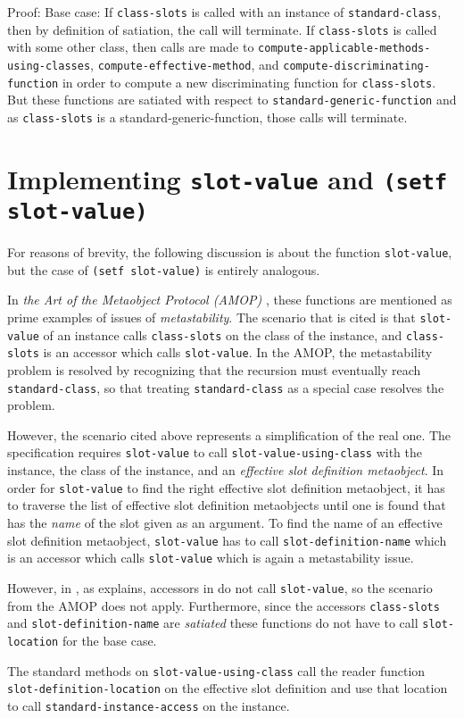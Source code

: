 Proof: Base case: If \texttt{class-slots} is called with an instance
of \texttt{standard-class}, then by definition of satiation, the call
will terminate.  If \texttt{class-slots} is called with some other
class, then calls are made to
\texttt{compute-applicable-methods-using-classes},
\texttt{compute-effective-method}, and
\texttt{compute-discriminating-function} in order to compute a new
discriminating function for \texttt{class-slots}.  But these functions
are satiated with respect to \texttt{standard-generic-function} and as
\texttt{class-slots} is a standard-generic-function, those calls
will terminate. 

\section{Implementing \texttt{slot-value} and \texttt{(setf slot-value)}}

For reasons of brevity, the following discussion is about the function
\texttt{slot-value}, but the case of \texttt{(setf slot-value)} is
entirely analogous. 

In \emph{the Art of the Metaobject Protocol (AMOP)}
\cite{Kiczales:1991:AMP:574212}, these functions are mentioned as
prime examples of issues of \emph{metastability}.  The scenario that
is cited is that \texttt{slot-value} of an instance calls
\texttt{class-slots} on the class of the instance, and
\texttt{class-slots} is an accessor which calls \texttt{slot-value}.
In the AMOP, the metastability problem is resolved by recognizing that
the recursion must eventually reach \texttt{standard-class}, so that
treating \texttt{standard-class} as a special case resolves the
problem.

However, the scenario cited above represents a simplification of the
real one.  The specification requires \texttt{slot-value} to call
\texttt{slot-value-using-class} with the instance, the class of the
instance, and an \emph{effective slot definition metaobject}.  In
order for \texttt{slot-value} to find the right effective slot
definition metaobject, it has to traverse the list of effective slot
definition metaobjects until one is found that has the \emph{name} of
the slot given as an argument.  To find the name of an effective slot
definition metaobject, \texttt{slot-value} has to call
\texttt{slot-definition-name} which is an accessor which calls
\texttt{slot-value} which is again a metastability issue.

However, in \sysname{}, as
 explains,
accessors in \sysname{} do not call \texttt{slot-value}, so the
scenario from the AMOP does not apply.  Furthermore, since the
accessors \texttt{class-slots} and \texttt{slot-definition-name} are
\emph{satiated}
 these
functions do not have to call \texttt{slot-location} for the base
case. 

The standard methods on \texttt{slot-value-using-class} call the
reader function \texttt{slot-definition-location} on the effective
slot definition and use that location to call
\texttt{standard-instance-access} on the instance.
